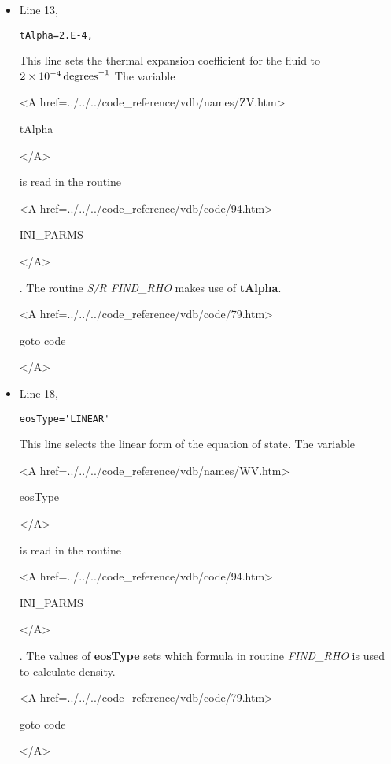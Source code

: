 \begin{itemize}
\item Line 13,
\begin{verbatim}
tAlpha=2.E-4,
\end{verbatim}
This line sets the thermal expansion coefficient for the fluid
to $2 \times 10^{-4}\,{\rm degrees}^{-1}$
The variable
{\bf
\begin{rawhtml} <A href=../../../code_reference/vdb/names/ZV.htm> \end{rawhtml}
tAlpha 
\begin{rawhtml} </A>\end{rawhtml}
}
is read in the routine
{\it
\begin{rawhtml} <A href=../../../code_reference/vdb/code/94.htm> \end{rawhtml}
INI\_PARMS
\begin{rawhtml} </A>\end{rawhtml}
}. The routine {\it S/R FIND\_RHO} makes use of {\bf tAlpha}.

{\bf
\begin{rawhtml} <A href=../../../code_reference/vdb/code/79.htm> \end{rawhtml}
goto code
\begin{rawhtml} </A>\end{rawhtml}
}

\item Line 18,
\begin{verbatim}
eosType='LINEAR'
\end{verbatim}
This line selects the linear form of the equation of state.
The variable
{\bf
\begin{rawhtml} <A href=../../../code_reference/vdb/names/WV.htm> \end{rawhtml}
eosType
\begin{rawhtml} </A>\end{rawhtml}
}
is read in the routine
{\it
\begin{rawhtml} <A href=../../../code_reference/vdb/code/94.htm> \end{rawhtml}
INI\_PARMS
\begin{rawhtml} </A>\end{rawhtml}
}. The values of {\bf eosType} sets which formula in routine
{\it FIND\_RHO} is used to calculate density.

{\bf
\begin{rawhtml} <A href=../../../code_reference/vdb/code/79.htm> \end{rawhtml}
goto code
\begin{rawhtml} </A>\end{rawhtml}
}




\end{itemize}
